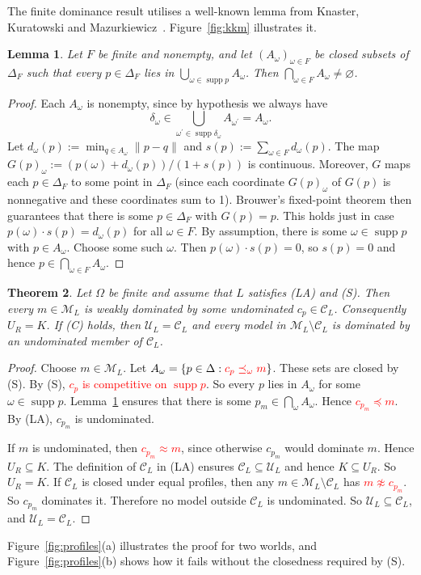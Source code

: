\documentclass[11pt]{article}
\newtheorem{theorem}{Theorem}[section]
\newtheorem{lemma}[theorem]{Lemma}
\theoremstyle{definition}
\theoremstyle{remark}
\newcommand{\M}{\mathcal M}
\newcommand{\C}{\mathcal C}
\newcommand{\U}{\mathcal U}
\newcommand{\supp}{\operatorname{supp}}
\begin{document}
The finite dominance result utilises a well-known lemma from Knaster, Kuratowski and Mazurkiewicz~\cite{KKM}. Figure~\ref{fig:kkm} illustrates it.


\begin{lemma}\label{lem:kkm}
Let $F$ be finite and nonempty, and let $(A_\omega)_{\omega\in F}$ be closed subsets of $\Delta_F$ such that every $p\in\Delta_F$ lies in $\bigcup_{\omega\in\supp p}A_\omega$. Then $\bigcap_{\omega\in F}A_\omega\ne\varnothing$.
\end{lemma}
\begin{proof}
Each $A_\omega$ is nonempty, since by hypothesis we always have 
\[
\delta_\omega\in\bigcup_{\omega^\prime\in\supp \delta_\omega}A_{\omega^\prime}=A_\omega.
\]
Let $d_\omega(p):=\min_{q\in A_\omega}\lVert p-q \rVert$ and $s(p):=\sum_{\omega\in F} d_\omega(p)$. The map $G(p)_\omega:=(p(\omega)+d_\omega(p))/(1+s(p))$ is continuous. Moreover, $G$ maps each $p\in\Delta_F$ to some point in $\Delta_F$ (since each coordinate $G(p)_\omega$ of $G(p)$ is nonnegative and these coordinates sum to 1). Brouwer's fixed-point theorem then guarantees that there is some $p\in\Delta_F$ with $G(p)=p$. This holds just in case $p(\omega)\cdot s(p)=d_\omega(p)$ for all $\omega\in F$. By assumption, there is some $\omega\in\supp p$ with $p\in A_\omega$. Choose some such $\omega$. Then $p(\omega)\cdot s(p)=0$, so $s(p)=0$ and hence $p\in\bigcap_{\omega\in F}A_\omega$.
\end{proof}
\begin{theorem}\label{thm:kkm}
Let $\Omega$ be finite and assume that $L$ satisfies (LA) and (S). Then every $m\in\M_L$ is weakly dominated by some undominated $c_p\in\C_L$. Consequently $U_R=K$. If (C) holds, then $\U_L=\C_L$ and every model in $\M_L\setminus\C_L$ is dominated by an undominated member of $\C_L$. 
\end{theorem}
\begin{proof}
Choose $m\in\M_L$. Let $A_\omega=\{p\in\Delta:\textcolor{red}{c_p\preceq_\omega m}\}$. These sets are closed by (S). By (S), \textcolor{red}{$c_p$ is competitive on $\supp p$}. So every $p$ lies in $A_\omega$ for some $\omega\in\supp p$. Lemma~\ref{lem:kkm} ensures that there is some $p_m\in\bigcap_\omega A_\omega$. Hence \textcolor{red}{$c_{p_m}\preceq m$}. By (LA), $c_{p_m}$ is undominated.

If $m$ is undominated, then \textcolor{red}{$c_{p_m}\approx m$}, since otherwise $c_{p_m}$ would dominate $m$. Hence $U_R\subseteq K$. The definition of $\C_L$ in (LA) ensures $\C_L\subseteq\U_L$ and hence $K\subseteq U_R$. So $U_R = K$. If $\C_L$ is closed under equal profiles, then any $m\in\M_L\setminus\C_L$ has \textcolor{red}{$m\not\approx c_{p_m}$}. So $c_{p_m}$ dominates it. Therefore no model outside $\C_L$ is undominated. So $\U_L\subseteq\C_L$, and $\U_L=\C_L$.
\end{proof}
Figure~\ref{fig:profiles}(a) illustrates the proof for two worlds, and Figure~\ref{fig:profiles}(b) shows how it fails without the closedness required by (S).
\end{document}
